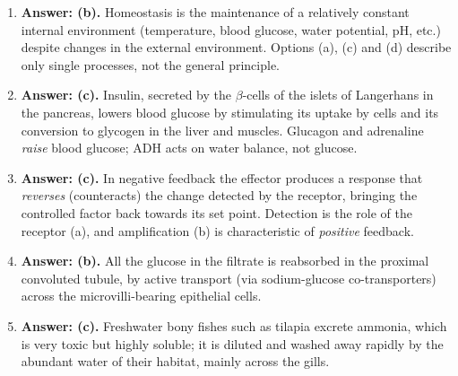 \documentclass[11pt]{article}
\newcommand{\cle}[1]{{\popxbold\color{popdark}#1}}
\begin{document}
\begin{corrige}
\begin{enumerate}
\item \textbf{Answer: (b).} Homeostasis is the maintenance of a relatively constant internal environment (temperature, blood glucose, water potential, pH, etc.) despite changes in the external environment. Options (a), (c) and (d) describe only single processes, not the general principle.
\item \textbf{Answer: (c).} Insulin, secreted by the $\beta$-cells of the islets of Langerhans in the pancreas, lowers blood glucose by stimulating its uptake by cells and its conversion to glycogen in the liver and muscles. Glucagon and adrenaline \emph{raise} blood glucose; ADH acts on water balance, not glucose.
\item \textbf{Answer: (c).} In negative feedback the effector produces a response that \emph{reverses} (counteracts) the change detected by the receptor, bringing the controlled factor back towards its set point. Detection is the role of the receptor (a), and amplification (b) is characteristic of \emph{positive} feedback.
\item \textbf{Answer: (b).} All the glucose in the filtrate is reabsorbed in the \cle{proximal convoluted tubule}, by active transport (via sodium-glucose co-transporters) across the microvilli-bearing epithelial cells.
\item \textbf{Answer: (c).} Freshwater bony fishes such as tilapia excrete \cle{ammonia}, which is very toxic but highly soluble; it is diluted and washed away rapidly by the abundant water of their habitat, mainly across the gills.
\end{enumerate}
\end{corrige}
\end{document}
